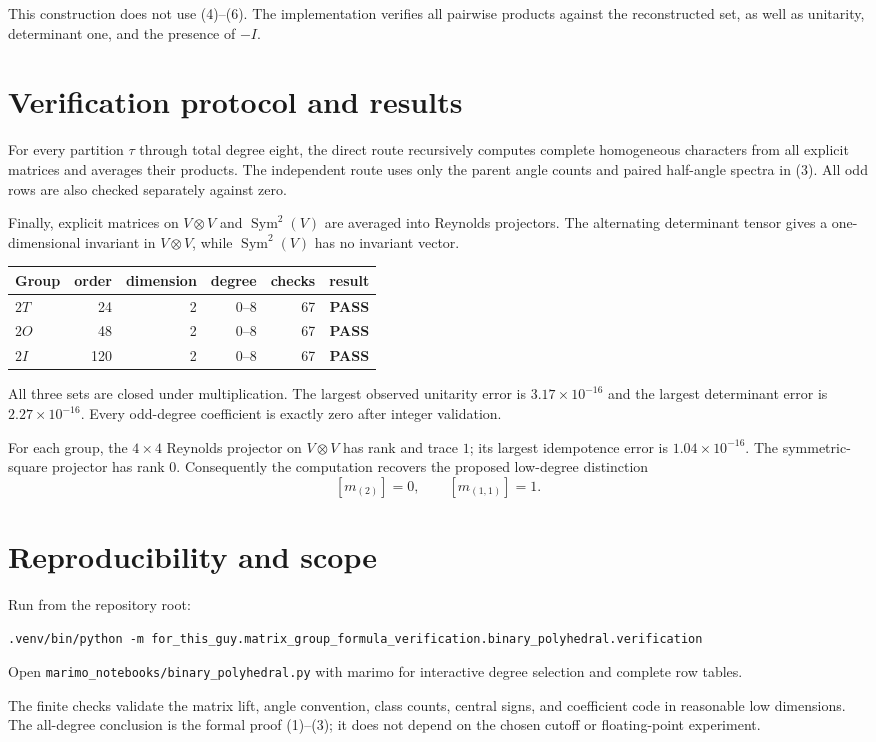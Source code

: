 \documentclass[11pt]{article}
\newcommand{\Sym}{\operatorname{Sym}}
\newcommand{\PASS}{\textcolor{passgreen}{\textbf{PASS}}}
\begin{document}
This construction does not use (4)--(6).  The implementation verifies all
pairwise products against the reconstructed set, as well as unitarity,
determinant one, and the presence of $-I$.

\section{Verification protocol and results}

For every partition $\tau$ through total degree eight, the direct route
recursively computes complete homogeneous characters from all explicit
matrices and averages their products.  The independent route uses only the
parent angle counts and paired half-angle spectra in (3).  All odd rows are
also checked separately against zero.

Finally, explicit matrices on $V\otimes V$ and $\Sym^2(V)$ are averaged into
Reynolds projectors.  The alternating determinant tensor gives a one-dimensional
invariant in $V\otimes V$, while $\Sym^2(V)$ has no invariant vector.

\begin{center}
\begin{tabularx}{\linewidth}{@{}Xrrrrc@{}}
\toprule
Group & order & dimension & degree & checks & result\\
\midrule
$2T$ & 24 & 2 & $0$--$8$ & 67 & \PASS\\
$2O$ & 48 & 2 & $0$--$8$ & 67 & \PASS\\
$2I$ & 120 & 2 & $0$--$8$ & 67 & \PASS\\
\bottomrule
\end{tabularx}
\end{center}

All three sets are closed under multiplication.  The largest observed
unitarity error is $3.17\times10^{-16}$ and the largest determinant error is
$2.27\times10^{-16}$.  Every odd-degree coefficient is exactly zero after
integer validation.

For each group, the $4\times4$ Reynolds projector on $V\otimes V$ has rank and
trace $1$; its largest idempotence error is $1.04\times10^{-16}$.  The
symmetric-square projector has rank $0$.  Consequently the computation
recovers the proposed low-degree distinction
\[
[m_{(2)}]=0,\qquad [m_{(1,1)}]=1.
\]

\section{Reproducibility and scope}

Run from the repository root:
{\scriptsize
\begin{verbatim}
.venv/bin/python -m for_this_guy.matrix_group_formula_verification.binary_polyhedral.verification
\end{verbatim}
}
Open \texttt{marimo\_notebooks/binary\_polyhedral.py} with marimo for interactive
degree selection and complete row tables.

The finite checks validate the matrix lift, angle convention, class counts,
central signs, and coefficient code in reasonable low dimensions.  The
all-degree conclusion is the formal proof (1)--(3); it does not depend on the
chosen cutoff or floating-point experiment.
\end{document}
